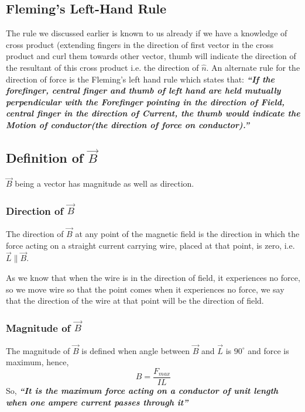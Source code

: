 \subsection*{Fleming's Left-Hand Rule}
The rule we discussed earlier is known to us already if we have 
a knowledge of cross product (extending fingers in the direction of 
first vector in the cross product and curl them towards other vector, thumb will indicate the direction of the resultant of this cross
product i.e. the direction of $\hat{n}$. An alternate rule for the
direction of force is the Fleming’s left hand rule which states that:
\newline
\textit{\textbf{“If the forefinger, central finger and thumb of left hand are held mutually perpendicular with the Forefinger pointing in the direction of Field, central finger in the direction of Current, the thumb would indicate the Motion of conductor(the direction of force on conductor).”}}

\subsection*{Definition of $\vec{B}$}
$\vec{B}$ being a vector has magnitude as well as direction.

\subsubsection{Direction of $\vec{B}$}
The direction of $\vec{B}$ at any point of the magnetic field is the direction in which the force acting on a straight current carrying wire, placed at that point, is zero, i.e. $\vec{L}\parallel\vec{B}$.

As we know that when the wire is in the direction of field, it experiences no force, so we move wire so that the point comes when it experiences no force, we say that the direction of the wire at that point will be the direction of field.

\subsubsection{Magnitude of $\vec{B}$}
The magnitude of $\vec{B}$ is defined when angle between $\vec{B}$ and $\vec{L}$ is $90^{\circ}$ and force is maximum, hence,
\begin{equation}
  B = \frac{F_{max}}{IL}
\end{equation}
So, \textit{\textbf{“It is the maximum force acting on a conductor of unit length when one ampere current passes through it”}}


